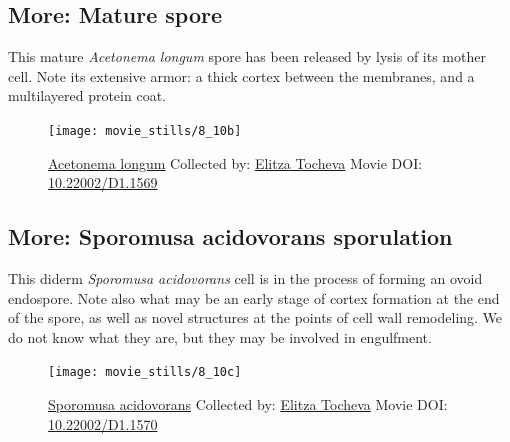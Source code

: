 \documentclass[]{tufte-book}
\begin{document}
\hypertarget{Mature_spore}{\subsection*{More: Mature
spore}\label{Mature_spore}}

This mature \emph{Acetonema longum} spore has been released by lysis of
its mother cell. Note its extensive armor: a thick cortex between the
membranes, and a multilayered protein coat.





\begin{figure}
\texttt{[image: movie\_stills/8\_10b]} \caption[\protect\hyperlink{tree}{Acetonema longum} Collected by:
\protect\hyperlink{elitza_tocheva}{Elitza Tocheva} Movie DOI:
\href{https://doi.org/10.22002/D1.1569}{10.22002/D1.1569}]{\protect\hyperlink{tree}{Acetonema longum} Collected by:
\protect\hyperlink{elitza_tocheva}{Elitza Tocheva} Movie DOI:
\href{https://doi.org/10.22002/D1.1569}{10.22002/D1.1569}}\label{fig:8-10b}
\end{figure}

\hypertarget{Sporomusa_acidovorans_sporulation}{\subsection*{More:
Sporomusa acidovorans
sporulation}\label{Sporomusa_acidovorans_sporulation}}

This diderm \emph{Sporomusa acidovorans} cell is in the process of
forming an ovoid endospore. Note also what may be an early stage of
cortex formation at the end of the spore, as well as novel structures at
the points of cell wall remodeling. We do not know what they are, but
they may be involved in engulfment.





\begin{figure}
\texttt{[image: movie\_stills/8\_10c]} \caption[\protect\hyperlink{tree}{Sporomusa acidovorans} Collected
by: \protect\hyperlink{elitza_tocheva}{Elitza Tocheva} Movie DOI:
\href{https://doi.org/10.22002/D1.1570}{10.22002/D1.1570}]{\protect\hyperlink{tree}{Sporomusa acidovorans} Collected
by: \protect\hyperlink{elitza_tocheva}{Elitza Tocheva} Movie DOI:
\href{https://doi.org/10.22002/D1.1570}{10.22002/D1.1570}}\label{fig:8-10c}
\end{figure}
\end{document}
